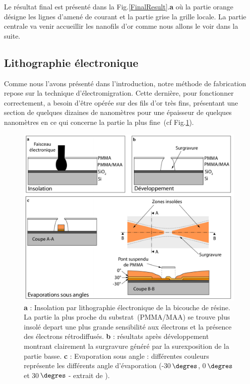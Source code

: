 Le résultat final est présenté dans la Fig.\ref{FinalResult}.\textbf{a} où la partie orange désigne les lignes d'amené de courant et la partie grise la grille locale. La partie centrale va venir accueillir les nanofils d'or comme nous allons le voir dans la suite.


\subsection{Lithographie électronique}



Comme nous l'avons présenté dans l'introduction, notre méthode de fabrication repose sur la technique d'électromigration. Cette dernière, pour fonctionner correctement, a besoin d'\^etre opérée sur des fils d'or très fins, présentant une section de quelques dizaines de nanomètres pour une épaisseur de quelques nanomètres en ce qui concerne la partie la plus fine~(cf Fig.\ref{EvapAngle}). 

\begin{figure}[h!]
\centering \includegraphics[scale=0.45]{Fabrication/EvapAngle/EvapAngle.pdf}
\caption{\textbf{a} : Insolation par lithographie électronique de la bicouche de résine. La partie la plus proche du substrat~(PMMA/MAA) se trouve plus insolé depart une plus grande sensibilité aux électrons et la présence des électrons rétrodiffusés. \textbf{b} : résultats après développement montrant clairement la surgravure généré par la surexposition de la partie basse. \textbf{c} : Evaporation sous angle : différentes couleurs représente les différents angle d'évaporation (-30$\,\degres$, 0$\,\degres$ et 30$\,\degres$ - extrait de \cite{RochPhD}).}
\label{EvapAngle}
\end{figure}

